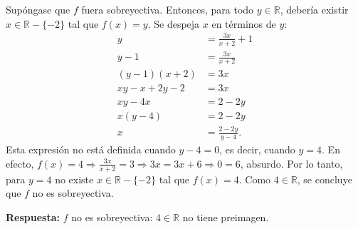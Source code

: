 \documentclass[11pt]{article}
\begin{document}
Supóngase que $f$ fuera sobreyectiva. Entonces, para todo $y\in\mathbb R$, debería existir $x\in\mathbb R-\{-2\}$ tal que $f(x)=y$. Se despeja $x$ en términos de $y$:
\begin{align*}
y&=\frac{3x}{x+2}+1\\
y-1&=\frac{3x}{x+2}\\
(y-1)(x+2)&=3x\\
xy-x+2y-2&=3x\\
xy-4x&=2-2y\\
x(y-4)&=2-2y\\
x&=\frac{2-2y}{y-4}.
\end{align*}
Esta expresión no está definida cuando $y-4=0$, es decir, cuando $y=4$. En efecto, $f(x)=4\Rightarrow\frac{3x}{x+2}=3\Rightarrow3x=3x+6\Rightarrow0=6$, absurdo. Por lo tanto, para $y=4$ no existe $x\in\mathbb R-\{-2\}$ tal que $f(x)=4$. Como $4\in\mathbb R$, se concluye que $f$ no es sobreyectiva.

\textbf{Respuesta:} $f$ no es sobreyectiva: $4\in\mathbb R$ no tiene preimagen.
\end{document}
